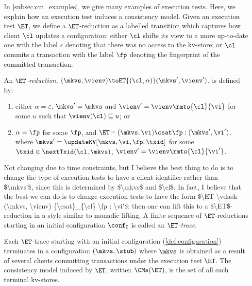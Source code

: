 In \cref{subsec:cm_examples}, we give many examples of execution tests. Here, we
explain how an execution test induces a consistency model. Given an execution test $\ET$, 
we define a $\ET$-reduction as a labelled transition which captures how
client $\cl$ updates a  configuration:  either  $\cl$
shifts its view to a more up-to-date one
with  the label $\varepsilon$ denoting  that 
	there was no access to the kv-store; or  $\cl$ 
	commits a transaction with the label $\fp$  denoting the
        fingerprint of the committed transaction.

\begin{definition}[ET-reduction]
An \emph{$\ET$-reduction}, $(\mkvs, \vienv) \toET{(\cl, \alpha)} (\mkvs', \vienv')$, is defined by:
\begin{enumerate}
    \item either $\alpha = \varepsilon$, $\mkvs' = \mkvs$ and $\vienv' =
      \vienv\rmto{\cl}{\vi}$ for some $u$ such that $ \vienv(\cl) \sqsubseteq u$; or
\item $\alpha = \fp$ for some $\fp$, and $\ET \vdash (\mkvs, \vi ) \csat \fp : (\mkvs', \vi')$, where $\mkvs' = \updateKV[\mkvs, \vi, \fp, \txid]$ 
   for some $\txid \in \nextTxid(\cl, \mkvs)$, $\vienv' =
   \vienv\rmto{\cl}{\vi'}$.
\end{enumerate}
\ac{Not changing due to time constraints, but I believe the best thing to do is to change the type of execution tests to have a client identifier 
rather than $\mkvs'$, since this is determined by $\mkvs$ and $\cl$. In fact, I believe that the best we can do is to change execution tests to 
have the form $\ET \vdash (\mkvs, \vienv) {\csat}_{\cl} \fp : \vi'$; then one can lift this to a $\ET$-reduction in a style similar to monadic lifting.}
A finite sequence of $\ET$-reductions starting in an
initial configuration $\conf_{0}$ is called  an \emph{$\ET$-trace}. 
\end{definition}
Each $\ET$-trace  starting with an initial configuration
(\cref{def:configuration}) terminates in a configuration $(\mkvs, \stub)$ where $\mkvs$ is obtained as a result of several clients committing transactions under the 
execution test $\ET$. The consistency model induced by $\ET$, 
written $\CMs(\ET)$, is the set of all such terminal kv-stores.
%

